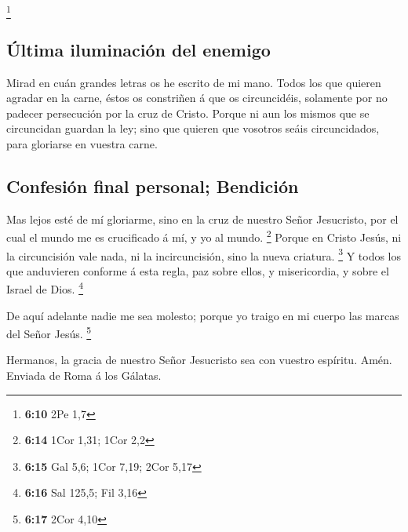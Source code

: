\footnote{\textbf{6:10} 2Pe 1,7}

\hypertarget{uxfaltima-iluminaciuxf3n-del-enemigo}{%
\subsection{Última iluminación del
enemigo}\label{uxfaltima-iluminaciuxf3n-del-enemigo}}

 Mirad en cuán grandes letras os he escrito de mi mano.
 Todos los que quieren agradar en la carne, éstos os
constriñen á que os circuncidéis, solamente por no padecer persecución
por la cruz de Cristo.  Porque ni aun los mismos que se
circuncidan guardan la ley; sino que quieren que vosotros seáis
circuncidados, para gloriarse en vuestra carne.

\hypertarget{confesiuxf3n-final-personal-bendiciuxf3n}{%
\subsection{Confesión final personal;
Bendición}\label{confesiuxf3n-final-personal-bendiciuxf3n}}

 Mas lejos esté de mí gloriarme, sino en la cruz de nuestro
Señor Jesucristo, por el cual el mundo me es crucificado á mí, y yo al
mundo. \footnote{\textbf{6:14} 1Cor 1,31; 1Cor 2,2}  Porque
en Cristo Jesús, ni la circuncisión vale nada, ni la incircuncisión,
sino la nueva criatura. \footnote{\textbf{6:15} Gal 5,6; 1Cor 7,19; 2Cor
  5,17}  Y todos los que anduvieren conforme á esta regla,
paz sobre ellos, y misericordia, y sobre el Israel de Dios. \footnote{\textbf{6:16}
  Sal 125,5; Fil 3,16}

 De aquí adelante nadie me sea molesto; porque yo traigo en
mi cuerpo las marcas del Señor Jesús. \footnote{\textbf{6:17} 2Cor 4,10}

 Hermanos, la gracia de nuestro Señor Jesucristo sea con
vuestro espíritu. Amén. Enviada de Roma á los Gálatas.
